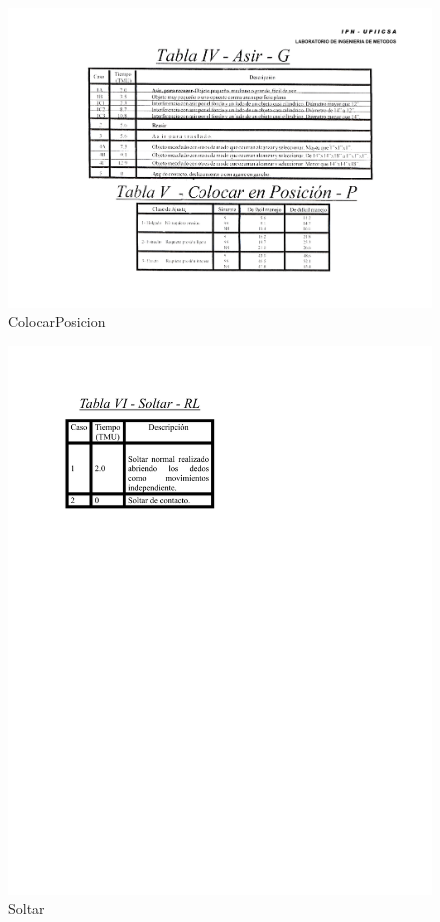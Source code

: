     \begin{figure}[H]
        \centering
        \includegraphics[scale=0.5]{13/img/tablaColocarPosicion.pdf}
        \caption{ColocarPosicion}
        \label{fig:ColocarPosicion}
    \end{figure}
    \begin{figure}[H]
        \centering
        \includegraphics[scale=0.6]{13/img/tablaSoltar.pdf}
        \caption{Soltar}
        \label{fig:Soltar}
    \end{figure}
